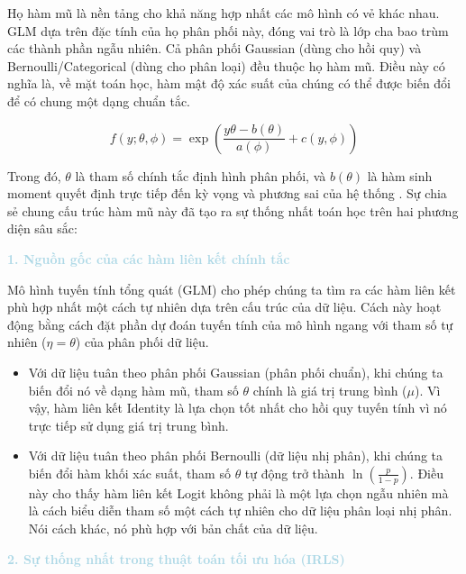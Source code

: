 Họ hàm mũ là nền tảng cho khả năng hợp nhất các mô hình có vẻ khác nhau. GLM dựa trên đặc tính của họ phân phối này, đóng vai trò là lớp cha bao trùm các thành phần ngẫu nhiên. Cả phân phối Gaussian (dùng cho hồi quy) và Bernoulli/Categorical (dùng cho phân loại) đều thuộc họ hàm mũ. Điều này có nghĩa là, về mặt toán học, hàm mật độ xác suất của chúng có thể được biến đổi để có chung một dạng chuẩn tắc.

\begin{equation}
    f(y; \theta, \phi) = \exp \left( \frac{y\theta - b(\theta)}{a(\phi)} + c(y, \phi) \right)
\end{equation}

Trong đó, $\theta$ là tham số chính tắc định hình phân phối, và $b(\theta)$ là hàm sinh moment quyết định trực tiếp đến kỳ vọng và phương sai của hệ thống \cite{wainwright2008graphical}. Sự chia sẻ chung cấu trúc hàm mũ này đã tạo ra sự thống nhất toán học trên hai phương diện sâu sắc:

\vspace{0.5em}
\noindent\textcolor{lightblue}{\textbf{1. Nguồn gốc của các hàm liên kết chính tắc}}
\vspace{0.5em}

Mô hình tuyến tính tổng quát (GLM) cho phép chúng ta tìm ra các hàm liên kết phù hợp nhất một cách tự nhiên dựa trên cấu trúc của dữ liệu. Cách này hoạt động bằng cách đặt phần dự đoán tuyến tính của mô hình ngang với tham số tự nhiên ($\eta = \theta$) của phân phối dữ liệu. 
\begin{itemize}
    \item Với dữ liệu tuân theo phân phối Gaussian (phân phối chuẩn), khi chúng ta biến đổi nó về dạng hàm mũ, tham số $\theta$ chính là giá trị trung bình ($\mu$). Vì vậy, hàm liên kết Identity là lựa chọn tốt nhất cho hồi quy tuyến tính vì nó trực tiếp sử dụng giá trị trung bình.
    \item Với dữ liệu tuân theo phân phối Bernoulli (dữ liệu nhị phân), khi chúng ta biến đổi hàm khối xác suất, tham số $\theta$ tự động trở thành $\ln(\frac{p}{1-p})$. Điều này cho thấy hàm liên kết Logit không phải là một lựa chọn ngẫu nhiên mà là cách biểu diễn tham số một cách tự nhiên cho dữ liệu phân loại nhị phân. Nói cách khác, nó phù hợp với bản chất của dữ liệu.
\end{itemize}

\vspace{0.5em}
\noindent\textcolor{lightblue}{\textbf{2. Sự thống nhất trong thuật toán tối ưu hóa (IRLS)}}
\vspace{0.5em}

